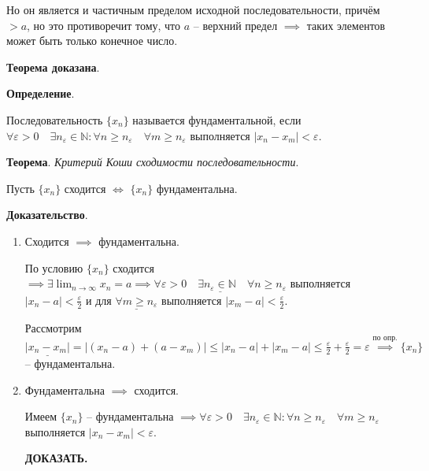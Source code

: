 \documentclass{article}
\newcommand{\bydef}{\stackrel{\text{по опр.}}{\implies}} %
\newcommand{\parspace}{\vspace{10pt}}
\begin{document}
Но он является и частичным пределом исходной последовательности, причём $> a$, но
это противоречит тому, что $a$ -- верхний предел $\implies$ таких элементов может
быть только конечное число.

\textbf{Теорема доказана}.

\parspace

\textbf{Определение}.

Последовательность $\{x_n\}$ называется фундаментальной, если 
$\forall \varepsilon > 0 \quad \exists n_\varepsilon \in \mathbb{N}:
\forall n \ge n_\varepsilon \quad \forall m \ge n_\varepsilon$
выполняется $|x_n - x_m| < \varepsilon$.

\parspace

\textbf{Теорема}. \textit{Критерий Коши сходимости последовательности}.

Пусть $\{x_n\}$ сходится $\Leftrightarrow$ $\{x_n\}$ фундаментальна.

\textbf{Доказательство}.

\begin{enumerate}
    \item Сходится $\implies$ фундаментальна.
    
    По условию $\{x_n\}$ сходится $\implies \exists \displaystyle\lim_{n \to \infty} x_n = a
    \implies \underline{\forall \varepsilon > 0 \quad \exists n_\varepsilon \in \mathbb{N} \quad \forall n \ge n_\varepsilon}$
    выполняется $|x_n - a| < \frac{\varepsilon}{2}$ и для $\underline{\forall m \ge n_\varepsilon}$ 
    выполняется $|x_m - a| < \frac{\varepsilon}{2}$.

    Рассмотрим $\underline{|x_n - x_m|} = |(x_n - a) + (a - x_m)| 
    \le |x_n - a| + |x_m - a| \le \frac{\varepsilon}{2} + \frac{\varepsilon}{2} = \varepsilon
    \bydef \{x_n\}$ -- фундаментальна.

    \item Фундаментальна $\implies$ сходится.
    
    Имеем $\{x_n\}$ -- фундаментальна 
    $\implies \forall \varepsilon > 0 \quad \exists n_\varepsilon \in \mathbb{N}:
    \forall n \ge n_\varepsilon \quad \forall m \ge n_\varepsilon$ выполняется
    $|x_n - x_m| < \varepsilon$.

    \textbf{ДОКАЗАТЬ.}
\end{enumerate}
\end{document}
